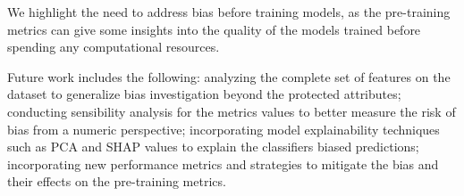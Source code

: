 \documentclass[12pt]{article}
\begin{document}
We highlight the need to address bias before training models, as the pre-training metrics can give some insights into the quality of the models trained before spending any computational resources.

Future work includes the following: analyzing the complete set of features on the dataset to generalize bias investigation beyond the protected attributes; conducting sensibility analysis for the metrics values to better measure the risk of bias from a numeric perspective; incorporating model explainability techniques such as PCA and SHAP values to explain the classifiers biased predictions; incorporating new performance metrics and strategies to mitigate the bias and their effects on the pre-training metrics.



\clearpage 



\end{document}
